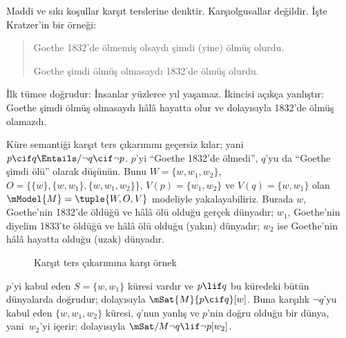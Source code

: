 \documentclass[../../../include/open-logic-section]{subfiles}
\begin{document}


Maddi ve sıkı koşullar karşıt terslerine denktir. Karşıolgusallar değildir.
İşte Kratzer'in bir örneği:
\begin{quote}
  Goethe 1832'de ölmemiş olsaydı şimdi (yine) ölmüş olurdu.

  Goethe şimdi ölmüş olmasaydı 1832'de ölmüş olurdu.
\end{quote}
İlk tümce doğrudur: İnsanlar yüzlerce yıl yaşamaz. İkincisi açıkça yanlıştır:
Goethe şimdi ölmüş olmasaydı hâlâ hayatta olur ve dolayısıyla 1832'de ölmüş
olamazdı.

\begin{ex}
  Küre semantiği karşıt ters çıkarımını geçersiz kılar; yani
  $p\cif q\Entails/\lnot q\cif\lnot p$. $p$'yi ``Goethe 1832'de ölmedi'',
  $q$'yu da ``Goethe şimdi ölü'' olarak düşünün. Bunu
  $W=\{w,w_1,w_2\}$, $O=\{\{w\},\{w,w_1\},\{w,w_1,w_2\}\}$,
  $V(p)=\{w_1,w_2\}$ ve $V(q)=\{w,w_1\}$ olan
  $\mModel{M}=\tuple{W,O,V}$ modeliyle yakalayabiliriz. Burada $w$,
  Goethe'nin 1832'de öldüğü ve hâlâ ölü olduğu gerçek dünyadır; $w_1$,
  Goethe'nin diyelim 1833'te öldüğü ve hâlâ ölü olduğu (yakın) dünyadır;
  $w_2$ ise Goethe'nin hâlâ hayatta olduğu (uzak) dünyadır.
\begin{figure}
\begin{center}
\caption{Karşıt ters çıkarımına karşı örnek}
\end{center}
\end{figure}
$p$'yi kabul eden $S=\{w,w_1\}$ küresi vardır ve $p\lif q$ bu küredeki
bütün dünyalarda doğrudur; dolayısıyla $\mSat{M}{p\cif q}[w]$. Buna karşılık
$\lnot q$'yu kabul eden $\{w,w_1,w_2\}$ küresi, $q$'nun yanlış ve $p$'nin
doğru olduğu bir dünya, yani~$w_2$'yi içerir; dolayısıyla
$\mSat/{M}{\lnot q\lif\lnot p}[w_2]$.
\end{ex}
\end{document}
